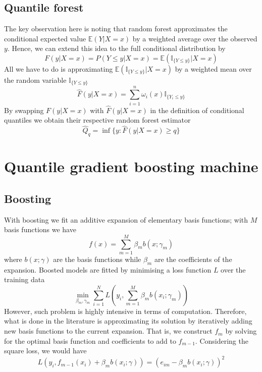 \subsection{Quantile forest}
The key observation here is noting that random forest approximates the conditional expected value $\mathbb{E}(Y|X=x)$ by a weighted average over the observed $y$.
Hence, we can extend this idea to the full conditional distribution by
\begin{equation}
    F(y|X=x)=P(Y\leq y|X=x)=\mathbb{E}(\mathbb{I}_{\{Y\leq y\}}|X=x)
\end{equation}
All we have to do is approximating $\mathbb{E}(\mathbb{I}_{\{Y\leq y\}}|X=x)$ by a weighted mean over the random variable $\mathbb{I}_{\{Y\leq y\}}$
\begin{equation}
    \hat{F}(y|X=x)=\sum\limits_{i=1}^{n}\omega_i(x)\mathbb{I}_{\{Y_i\leq y\}}
\end{equation}
By swapping $F(y|X=x)$ with $\hat{F}(y|X=x)$ in the definition of conditional quantiles we obtain their respective random forest estimator
\begin{equation}
    \hat{Q}_q=\inf\{y:\hat{F}(y|X=x)\geq q\}
\end{equation}


\section{Quantile gradient boosting machine}
\subsection{Boosting}
With boosting we fit an additive expansion of elementary basis functions; with $M$ basis functions we have 
\begin{equation}
    f(x)=\sum\limits_{m=1}^{M}\beta_m b(x;\gamma_m)
\end{equation}
where $b(x;\gamma)$ are the basis functions while $\beta_m$ are the coefficients of the expansion.
Boosted models are fitted by minimising a loss function $L$ over the training data
\begin{equation}
    \min_{\beta_m, \gamma_m}\sum\limits_{i=1}^{N}L\left(y_i, \sum\limits_{m=1}^M \beta_m b(x_i;\gamma_m)\right)
\end{equation}
However, such problem is highly intensive in terms of computation. Therefore, what is done in the literature is approximating its solution by iteratively adding new basis functions to the current expansion. That is, we construct $f_m$ by solving for the optimal basis function and coefficients to add to $f_{m-1}$. Considering the square loss, we would have
\begin{equation}
    L(y_i, f_{m-1}(x_i)+\beta_m b(x_i;\gamma))=(e_{im}-\beta_m b(x_i;\gamma))^2
\end{equation}

